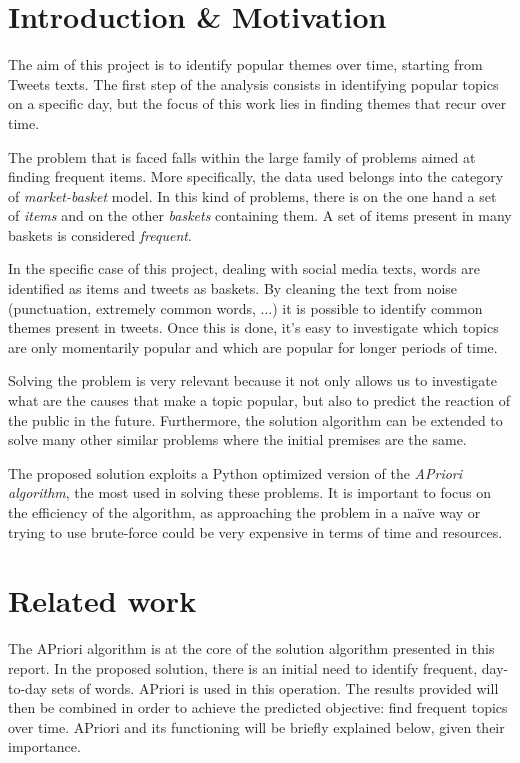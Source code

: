 
\section{Introduction \& Motivation}

The aim of this project is to identify popular themes over time, starting from Tweets texts. The first step of the analysis consists in identifying popular topics on a specific day, but the focus of this work lies in finding themes that recur over time.

The problem that is faced falls within the large family of problems aimed at finding frequent items. More specifically, the data used belongs into the category of \textit{market-basket} model. In this kind of problems, there is on the one hand a set of \textit{items} and on the other \textit{baskets} containing them. A set of items present in many baskets is considered \textit{frequent}.

In the specific case of this project, dealing with social media texts, words are identified as items and tweets as baskets. By cleaning the text from noise (punctuation, extremely common words, ...) it is possible to identify common themes present in tweets. Once this is done, it's easy to investigate which topics are only momentarily popular and which are popular for longer periods of time.

Solving the problem is very relevant because it not only allows us to investigate what are the causes that make a topic popular, but also to predict the reaction of the public in the future. Furthermore, the solution algorithm can be extended to solve many other similar problems where the initial premises are the same.

The proposed solution exploits a Python optimized version of the \textit{APriori algorithm}, the most used in solving these problems. It is important to focus on the efficiency of the algorithm, as approaching the problem in a naïve way or trying to use brute-force could be very expensive in terms of time and resources.



\section{Related work}

The APriori algorithm is at the core of the solution algorithm presented in this report. In the proposed solution, there is an initial need to identify frequent, day-to-day sets of words. APriori is used in this operation. The results provided will then be combined in order to achieve the predicted objective: find frequent topics over time. APriori and its functioning will be briefly explained below, given their importance.

